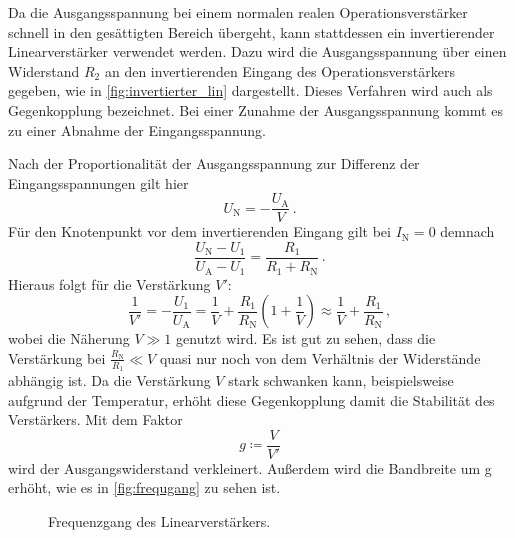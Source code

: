\noindent 
Da die Ausgangsspannung bei einem normalen realen Operationsverstärker schnell in den gesättigten Bereich übergeht, kann stattdessen ein invertierender Linearverstärker verwendet werden. Dazu wird die Ausgangsspannung über einen Widerstand $R_2$ an den invertierenden Eingang des Operationsverstärkers gegeben, wie in \autoref{fig:invertierter_lin} dargestellt. Dieses Verfahren wird auch als Gegenkopplung bezeichnet. Bei einer Zunahme der Ausgangsspannung kommt es zu einer Abnahme der Eingangsspannung. 


\noindent
Nach der Proportionalität der Ausgangsspannung zur Differenz der Eingangsspannungen gilt hier 
\begin{equation}
    U_\text{N} = - \frac{U_\text{A}}{V}\, .
\end{equation}
Für den Knotenpunkt vor dem invertierenden Eingang gilt bei $I_\text{N} = 0$ demnach 
\begin{equation*}
    \frac{U_\text{N} - U_1}{U_\text{A} - U_1} = \frac{R_1}{R_1 + R_\text{N}}\, .
\end{equation*}
Hieraus folgt für die Verstärkung $V'$: 
\begin{equation*}
    \frac{1}{V'} = - \frac{U_1}{U_\text{A}} = \frac{1}{V} + \frac{R_1}{R_\text{N}}\left(1 + \frac{1}{V}\right) \approx \frac{1}{V} + \frac{R_1}{R_\text{N}}\, ,
\end{equation*}
wobei die Näherung $V\gg 1$ genutzt wird. Es ist gut zu sehen, dass die Verstärkung bei $\frac{R_\text{N}}{R_1} \ll V$ quasi nur noch von dem Verhältnis der Widerstände abhängig ist. Da die Verstärkung $V$ stark schwanken kann, beispielsweise aufgrund der Temperatur, erhöht diese Gegenkopplung damit die Stabilität des Verstärkers. Mit dem Faktor 
\begin{equation*}
    g \coloneq \frac{V}{V'}
\end{equation*}
wird der Ausgangswiderstand verkleinert. Außerdem wird die Bandbreite um g erhöht, wie es in \autoref{fig:frequgang} zu sehen ist.
 
        


\begin{figure}[H]
    \centering
    \caption{Frequenzgang des Linearverstärkers. \cite{V51_old}}
    \label{fig:frequgang}
\end{figure}

